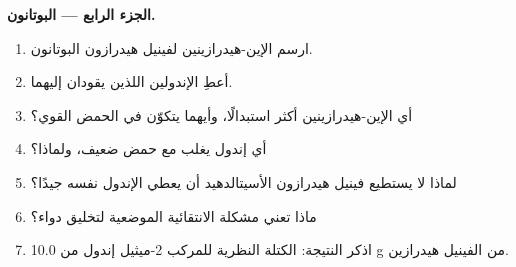 \begin{problem}
\medskip\noindent\textbf{الجزء الرابع --- البوتانون.}
\begin{enumerate}[resume]
  \item ارسم الإين-هيدرازينين لفينيل هيدرازون البوتانون.
  \item أعطِ الإندولين اللذين يقودان إليهما.
  \item أي الإين-هيدرازينين أكثر استبدالًا، وأيهما يتكوّن في الحمض القوي؟
  \item أي إندول يغلب مع حمض ضعيف، ولماذا؟
  \item لماذا لا يستطيع فينيل هيدرازون الأسيتالدهيد أن يعطي الإندول نفسه جيدًا؟
  \item ماذا تعني مشكلة الانتقائية الموضعية لتخليق دواء؟
  \item اذكر النتيجة: الكتلة النظرية للمركب 2-ميثيل إندول من 10.0 g من
        الفينيل هيدرازين.
\end{enumerate}
\end{problem}
